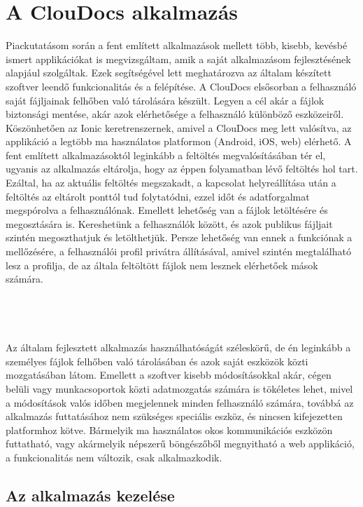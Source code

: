 \documentclass[12pt]{report}
\begin{document}
\chapter{A ClouDocs alkalmazás}
Piackutatásom során a fent említett alkalmazások mellett több, kisebb, kevésbé ismert applikációkat is megvizsgáltam, amik a saját alkalmazásom fejlesztésének alapjául szolgáltak. Ezek segítségével lett meghatározva az általam készített szoftver leendő funkcionalitás és a felépítése. A ClouDocs elsősorban a felhasználó saját fájljainak felhőben való tárolására készült. Legyen a cél akár a fájlok biztonsági mentése, akár azok elérhetősége a felhasználó különböző eszközeiről. Köszönhetően az Ionic keretrenszernek, amivel a ClouDocs meg lett valósítva, az applikáció a legtöbb ma használatos platformon (Android, iOS, web) elérhető. A fent említett alkalmazásoktól leginkább a feltöltés megvalósításában tér el, ugyanis az alkalmazás eltárolja, hogy az éppen folyamatban lévő feltöltés hol tart. Ezáltal, ha az aktuális feltöltés megszakadt, a kapcsolat helyreállítása után a feltöltés az eltárolt ponttól tud folytatódni, ezzel időt és adatforgalmat megspórolva a felhasználónak. Emellett lehetőség van a fájlok letöltésére és megosztására is. Kereshetünk a felhasználók között, és azok publikus fájljait szintén megoszthatjuk és letölthetjük. Persze lehetőség van ennek a funkciónak a mellőzésére, a felhasználói profil privátra állításával, amivel szintén megtalálható lesz a profilja, de az általa feltöltött fájlok nem lesznek elérhetőek mások számára.\\
\\
\\
\\
\\
Az általam fejlesztett alkalmazás használhatóságát széleskörű, de én leginkább a személyes fájlok felhőben való tárolásában és azok saját eszközök közti mozgatásában látom. Emellett a szoftver kisebb módosításokkal akár, cégen belüli vagy munkacsoportok közti adatmozgatás számára is tökéletes lehet, mivel a módosítások valós időben megjelennek minden felhasználó számára, továbbá az alkalmazás futtatásához nem szükséges speciális eszköz, és nincsen kifejezetten platformhoz kötve. Bármelyik ma használatos okos kommunikációs eszközön futtatható, vagy akármelyik népszerű böngészőből megnyitható a web applikáció, a funkcionalitás nem változik, csak alkalmazkodik.\newpage

\section{Az alkalmazás kezelése}
\end{document}
